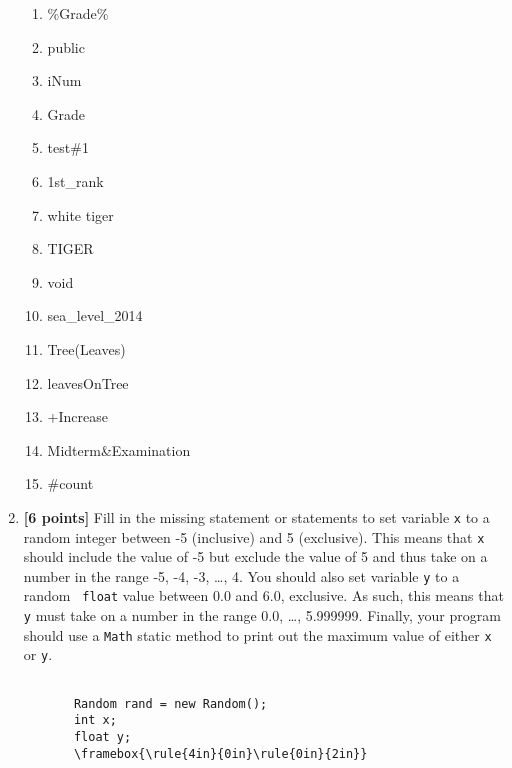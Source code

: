 \documentclass[11pt]{report}
\begin{document}
\begin{enumerate}
\begin{enumerate}
  \item \%Grade\%
  \item public
  \item iNum
  \item Grade
  \item test\#1
  \item 1st\_rank
  \item white tiger
  \item TIGER
    \item void
  \item sea\_level\_2014
  \item Tree(Leaves)
  \item leavesOnTree
    \item +Increase
  \item Midterm\&Examination
    \item \#count
\end{enumerate}
\bigskip

\item {\bf [6 points]} Fill in the missing statement or statements to set variable {\tt x} to a random integer between
  -5 (inclusive) and 5 (exclusive).  This means that {\tt x} should include the value of -5 but exclude the value of 5
  and thus take on a number in the range -5, -4, -3, \ldots, 4. You should also set variable {\tt y} to a random {\tt
  float} value between 0.0 and 6.0, exclusive. As such, this means that {\tt y} must take on a number in the range 0.0,
  \ldots, 5.999999. Finally, your program should use a {\tt Math} static method to print out the maximum value of either
  {\tt x} or {\tt y}.

\begin{Verbatim}[commandchars=\\\{\}]

       Random rand = new Random();
       int x;
       float y;
       \framebox{\rule{4in}{0in}\rule{0in}{2in}}
\end{Verbatim}

\newpage



\end{enumerate}
\end{document}
